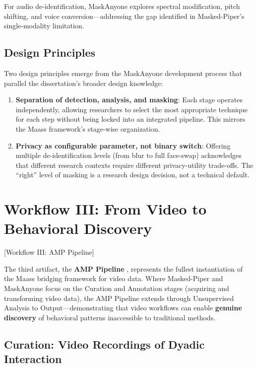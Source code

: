 \documentclass[../main.tex]{subfiles}
\begin{document}
For audio de-identification, MaskAnyone explores spectral modification, pitch shifting, and voice conversion---addressing the gap identified in Masked-Piper's single-modality limitation.

\subsection{Design Principles}

Two design principles emerge from the MaskAnyone development process that parallel the dissertation's broader design knowledge:

\begin{enumerate}
    \item \textbf{Separation of detection, analysis, and masking}: Each stage operates independently, allowing researchers to select the most appropriate technique for each step without being locked into an integrated pipeline. This mirrors the Maass framework's stage-wise organization.
    \item \textbf{Privacy as configurable parameter, not binary switch}: Offering multiple de-identification levels (from blur to full face-swap) acknowledges that different research contexts require different privacy-utility trade-offs. The ``right'' level of masking is a research design decision, not a technical default.
\end{enumerate}


\section{Workflow III: From Video to Behavioral Discovery}[Workflow III: AMP Pipeline]

The third artifact, the \textbf{AMP Pipeline} \parencite{owoyele2025amppipeline}, represents the fullest instantiation of the Maass bridging framework for video data. Where Masked-Piper and MaskAnyone focus on the Curation and Annotation stages (acquiring and transforming video data), the AMP Pipeline extends through Unsupervised Analysis to Output---demonstrating that video workflows can enable \textbf{genuine discovery} of behavioral patterns inaccessible to traditional methods.

\subsection{Curation: Video Recordings of Dyadic Interaction}
\end{document}
